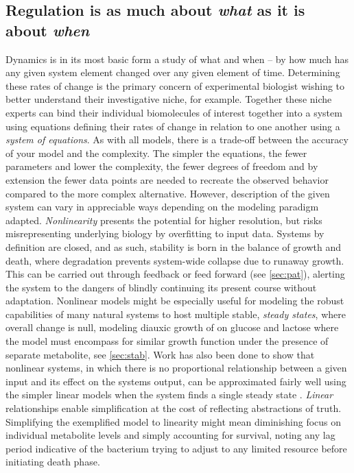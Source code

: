 \subsection{Regulation is as much about \emph{what} as it is about \emph{when}}
\label{sec:regwhatwhen}
Dynamics is in its most basic form a study of what and when -- by how much has any given system element changed over any given element of time. Determining these rates of change is the primary concern of experimental biologist wishing to better understand their investigative niche, for example. Together these niche experts can bind their individual biomolecules of interest together into a system using equations defining their rates of change in relation to one another using a \emph{system of equations}. As with all models, there is a trade-off between the accuracy of your model and the complexity. The simpler the equations, \ie the fewer parameters and lower the complexity, the fewer degrees of freedom and by extension the fewer data points are needed to recreate the observed behavior compared to the more complex alternative. However, description of the given system can vary in appreciable ways depending on the modeling paradigm adapted. 
\emph{Nonlinearity} presents the potential for higher resolution, but risks misrepresenting underlying biology by overfitting to input data. Systems by definition are closed, and as such, stability is born in the balance of growth and death, where degradation prevents system-wide collapse due to runaway growth\citep{alon2007design}. This can be carried out through feedback or feed forward (see \cref{sec:pat}), alerting the system to the dangers of blindly continuing its present course without adaptation. Nonlinear models might be especially useful for modeling the robust capabilities of many natural systems to host multiple stable, \emph{steady states}, where overall change is null, \eg modeling diauxic growth of \coli on glucose and lactose \citep{wong1997mathematical} where the model must encompass for similar growth function under the presence of separate metabolite, see \cref{sec:stab}. 
Work has also been done to show that nonlinear systems, in which there is no proportional relationship between a given input and its effect on the systems output, can be approximated fairly well using the simpler linear models when the system finds a single steady state \citep{wildenhain2006reconstructing, crampin2006system,zavlanos2011inferring}.  \emph{Linear} relationships enable simplification at the cost of reflecting abstractions of truth. Simplifying the exemplified model to linearity might mean diminishing focus on individual metabolite levels and simply accounting for survival, \eg noting any lag period indicative of the bacterium trying to adjust to any limited resource before initiating death phase.


